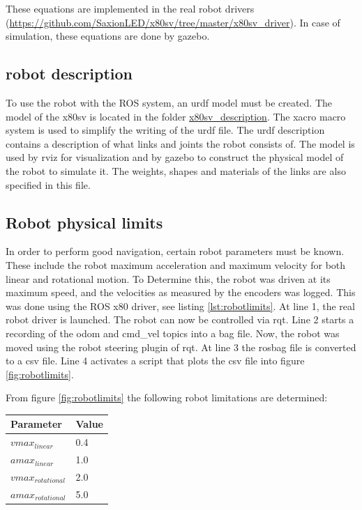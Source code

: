 \documentclass[a4paper]{article}
\begin{document}
These equations are implemented in the real robot drivers (\url{https://github.com/SaxionLED/x80sv/tree/master/x80sv_driver}). In case of simulation, these equations are done by gazebo.

\subsection{robot description}
To use the robot with the ROS system, an urdf model must be created. The model of the x80sv is
located in the folder \url{x80sv_description}. The xacro macro system is used to simplify the
writing of the urdf file. The urdf description contains a description of what links and joints
the robot consists of. The model is used by rviz for visualization and by gazebo to construct
the physical model of the robot to simulate it. The weights, shapes and materials of the links
are also specified in this file.

\subsection{Robot physical limits}
In order to perform good navigation, certain robot parameters must be known. These include the
robot maximum acceleration and maximum velocity for both linear and rotational motion. To
Determine this, the robot was driven at its maximum speed, and the velocities as measured by
the encoders was logged. This was done using the ROS x80 driver, see listing \ref{lst:robotlimits}.
At line 1, the real robot driver is launched. The robot can now be controlled via rqt.
Line 2 starts a recording of the odom and cmd\_vel topics into a bag file. Now, the robot
was moved using the robot steering plugin of rqt. At line 3 the rosbag file is converted to
a csv file. Line 4 activates a script that plots the csv file into figure \ref{fig:robotlimits}.

From figure \ref{fig:robotlimits} the following robot limitations are determined:

\begin{tabular}{ | l | l | }
  \hline                       
  Parameter & Value \\
  \hline                       
  \hline                       
  $vmax_{linear}$ & 0.4 \\
  \hline                       
  $amax_{linear}$ & 1.0 \\
  \hline                       
  $vmax_{rotational}$ & 2.0 \\
  \hline                       
  $amax_{rotational}$ & 5.0 \\
  \hline  
\end{tabular}
\end{document}
